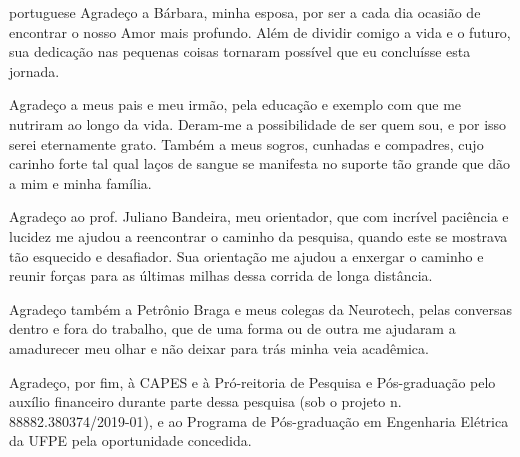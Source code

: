 \documentclass[
	11pt,				%
	openright,			%
	twoside,			%
	a4paper,			%
	french,				%
	brazil,			%
	english				%
	]{abntex2}
\begin{document}
\begin{resumo}[Agradecimentos]
\begin{otherlanguage*}{portuguese}
        Agrade\c co a B\'arbara, minha esposa, por ser a cada dia ocasi\~ao de encontrar o nosso Amor mais profundo. Al\'em de dividir comigo a vida e o futuro, sua dedica\c c\~ao nas pequenas coisas tornaram poss\'ivel que eu conclu\'isse esta jornada.

        Agrade\c co a meus pais e meu irm\~ao, pela educa\c c\~ao e exemplo com que me nutriram ao longo da vida. Deram-me a possibilidade de ser quem sou, e por isso serei eternamente grato. Tamb\'em a meus sogros, cunhadas e compadres, cujo carinho forte tal qual la\c cos de sangue se manifesta no suporte t\~ao grande que d\~ao a mim e minha fam\'ilia.

        Agrade\c co ao prof. Juliano Bandeira, meu orientador, que com incr\'ivel paci\^encia e lucidez me ajudou a reencontrar o caminho da pesquisa, quando este se mostrava t\~ao esquecido e desafiador. Sua orienta\c c\~ao me ajudou a enxergar o caminho e reunir for\c cas para as \'ultimas milhas dessa corrida de longa dist\^ancia.

        Agrade\c co tamb\'em a Petr\^onio Braga e meus colegas da Neurotech, pelas conversas dentro e fora do trabalho, que de uma forma ou de outra me ajudaram a amadurecer meu olhar e n\~ao deixar para tr\'as minha veia acad\^emica.

        Agrade\c co, por fim, \`a CAPES e \`a Pr\'o-reitoria de Pesquisa e P\'os-gradua\c c\~ao pelo aux\'ilio financeiro durante parte dessa pesquisa (sob o projeto n. 88882.380374/2019-01), e ao Programa de P\'os-gradua\c c\~ao em Engenharia El\'etrica da UFPE pela oportunidade concedida.
    \end{otherlanguage*}
\end{resumo}
\end{document}

